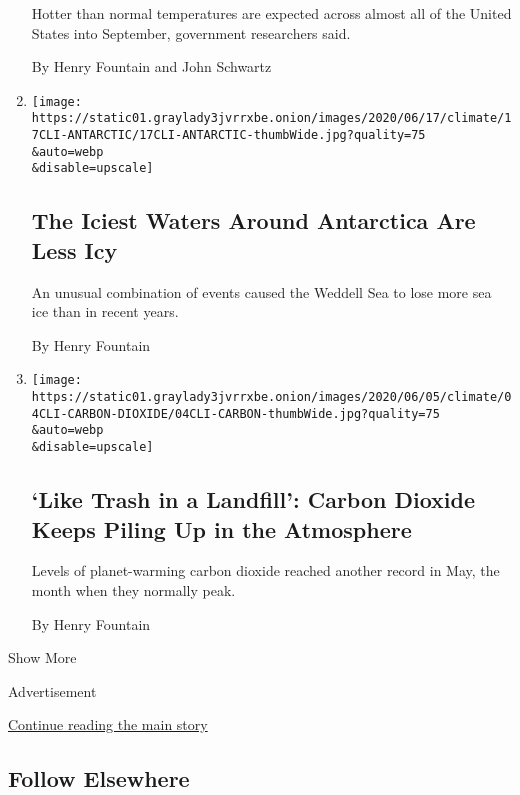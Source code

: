 \begin{enumerate}
  Hotter than normal temperatures are expected across almost all of the
  United States into September, government researchers said.

  By Henry Fountain and John Schwartz
\item
  \href{/2020/06/17/climate/antarctica-sea-ice-climate-change.html}{}

  \texttt{[image: https://static01.graylady3jvrrxbe.onion/images/2020/06/17/climate/17CLI-ANTARCTIC/17CLI-ANTARCTIC-thumbWide.jpg?quality=75\\\&auto=webp\\\&disable=upscale]}

  \hypertarget{the-iciest-waters-around-antarctica-are-less-icy}{%
  \subsection{The Iciest Waters Around Antarctica Are Less
  Icy}\label{the-iciest-waters-around-antarctica-are-less-icy}}

  An unusual combination of events caused the Weddell Sea to lose more
  sea ice than in recent years.

  By Henry Fountain
\item
  \href{/2020/06/04/climate/carbon-dioxide-record-climate-change.html}{}

  \texttt{[image: https://static01.graylady3jvrrxbe.onion/images/2020/06/05/climate/04CLI-CARBON-DIOXIDE/04CLI-CARBON-thumbWide.jpg?quality=75\\\&auto=webp\\\&disable=upscale]}

  \hypertarget{like-trash-in-a-landfill-carbon-dioxide-keeps-piling-up-in-the-atmosphere}{%
  \subsection{`Like Trash in a Landfill': Carbon Dioxide Keeps Piling Up
  in the
  Atmosphere}\label{like-trash-in-a-landfill-carbon-dioxide-keeps-piling-up-in-the-atmosphere}}

  Levels of planet-warming carbon dioxide reached another record in May,
  the month when they normally peak.

  By Henry Fountain
\end{enumerate}

Show More

Advertisement

\protect\hyperlink{after-mid2}{Continue reading the main story}

\hypertarget{follow-elsewhere}{%
\subsection{Follow Elsewhere}\label{follow-elsewhere}}

